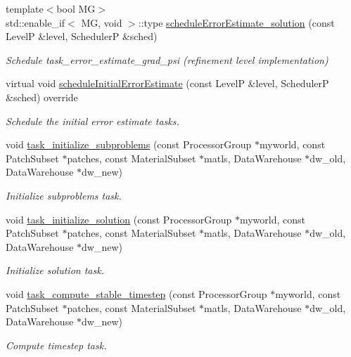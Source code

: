 \begin{DoxyCompactItemize}
{\footnotesize template$<$bool MG$>$ }\\std\+::enable\+\_\+if$<$ MG, void $>$\+::type \hyperlink{classUintah_1_1PhaseField_1_1Heat_a409db9828b044c7f8aec3b9833239678}{schedule\+Error\+Estimate\+\_\+solution} (const LevelP \&level, SchedulerP \&sched)
\begin{DoxyCompactList}\small\item\em Schedule task\+\_\+error\+\_\+estimate\+\_\+grad\+\_\+psi (refinement level implementation) \end{DoxyCompactList}\item 
virtual void \hyperlink{classUintah_1_1PhaseField_1_1Heat_a2c1ab4a698b92a06cd840786df5acc0a}{schedule\+Initial\+Error\+Estimate} (const LevelP \&level, SchedulerP \&sched) override
\begin{DoxyCompactList}\small\item\em Schedule the initial error estimate tasks. \end{DoxyCompactList}\item 
void \hyperlink{classUintah_1_1PhaseField_1_1Heat_abc95b8a4d937f440b074b64993d38fdf}{task\+\_\+initialize\+\_\+subproblems} (const Processor\+Group $\ast$myworld, const Patch\+Subset $\ast$patches, const Material\+Subset $\ast$matls, Data\+Warehouse $\ast$dw\+\_\+old, Data\+Warehouse $\ast$dw\+\_\+new)
\begin{DoxyCompactList}\small\item\em Initialize subproblems task. \end{DoxyCompactList}\item 
void \hyperlink{classUintah_1_1PhaseField_1_1Heat_a12321dbb2295d63fe3c1befb63a64051}{task\+\_\+initialize\+\_\+solution} (const Processor\+Group $\ast$myworld, const Patch\+Subset $\ast$patches, const Material\+Subset $\ast$matls, Data\+Warehouse $\ast$dw\+\_\+old, Data\+Warehouse $\ast$dw\+\_\+new)
\begin{DoxyCompactList}\small\item\em Initialize solution task. \end{DoxyCompactList}\item 
void \hyperlink{classUintah_1_1PhaseField_1_1Heat_a64acf05f60b90be0b1554dfeda495156}{task\+\_\+compute\+\_\+stable\+\_\+timestep} (const Processor\+Group $\ast$myworld, const Patch\+Subset $\ast$patches, const Material\+Subset $\ast$matls, Data\+Warehouse $\ast$dw\+\_\+old, Data\+Warehouse $\ast$dw\+\_\+new)
\begin{DoxyCompactList}\small\item\em Compute timestep task. \end{DoxyCompactList}\item 

\end{DoxyCompactItemize}
